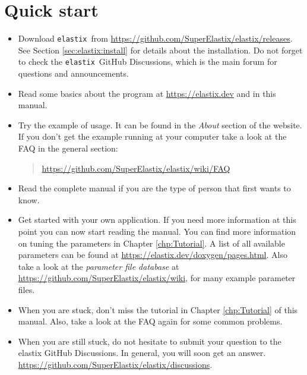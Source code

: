 \documentclass[]{report}
\newcommand{\elastix}{\texttt{elastix}}
\begin{document}

\section{Quick start}

\begin{itemize}
\item Download \elastix\ from \url{https://github.com/SuperElastix/elastix/releases}.
    See Section \ref{sec:elastix:install} for details about the
    installation. Do not forget to check the \elastix\ GitHub Discussions,
    which is the main forum for questions and announcements.

\item Read some basics about the program at
    \url{https://elastix.dev} and in this manual.

\item Try the example of usage. It can be found in the \emph{About}
section of the website. If you don't get the example running at your
computer take a look at the FAQ in the general section:
\begin{quote}
\url{https://github.com/SuperElastix/elastix/wiki/FAQ}
\end{quote}

\item Read the complete manual if you are the type of person that
first wants to know.

\item Get started with your own application. If you need more information
    at this point you can now start reading the manual. You can find more
    information on tuning the parameters in Chapter \ref{chp:Tutorial}. A
    list of all available parameters can be found at
    \url{https://elastix.dev/doxygen/pages.html}. Also take a look at
    the \emph{parameter file database} at
    \url{https://github.com/SuperElastix/elastix/wiki}, for many example parameter
    files.

\item When you are stuck, don't miss the tutorial in Chapter
\ref{chp:Tutorial} of this manual. Also, take a look at the FAQ again
for some common problems.

\item When you are still stuck, do not hesitate to submit your question to the elastix GitHub Discussions.
    In general, you will soon get an answer.
    \url{https://github.com/SuperElastix/elastix/discussions}.
\end{itemize}
\end{document}
